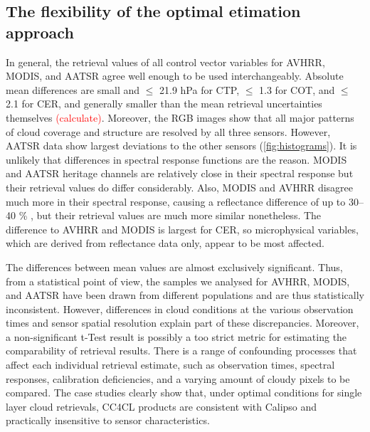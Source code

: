 \label{conclusions}

\subsection{The flexibility of the optimal etimation approach}


In general, the retrieval values of all control vector variables for AVHRR, MODIS, and AATSR agree well enough to be used interchangeably. Absolute mean differences are small and $\leq$ 21.9 hPa for CTP, $\leq$ 1.3 for COT, and $\leq$ 2.1 for CER, and generally smaller than the mean retrieval uncertainties themselves \textcolor{red}{(calculate)}. Moreover, the RGB images show that all major patterns of cloud coverage and structure are resolved by all three sensors. However, AATSR data show largest deviations to the other sensors (\cref{fig:histograms}). It is unlikely that differences in spectral response functions are the reason. MODIS and AATSR heritage channels are relatively close in their spectral response but their retrieval values do differ considerably. Also, MODIS and AVHRR disagree much more in their spectral response, causing a reflectance difference of up to 30--40 \% \citep{Trishchenko02}, but their retrieval values are much more similar nonetheless. The difference to AVHRR and MODIS is largest for CER, so microphysical variables, which are derived from reflectance data only, appear to be most affected. 

The differences between mean values are almost exclusively significant. Thus, from a statistical point of view, the samples we analysed for AVHRR, MODIS, and AATSR have been drawn from different populations and are thus statistically inconsistent. However, differences in cloud conditions at the various observation times and sensor spatial resolution explain part of these discrepancies. Moreover, a non-significant t-Test result is possibly a too strict metric for estimating the comparability of retrieval results. There is a range of confounding processes that affect each individual retrieval estimate, such as observation times, spectral responses, calibration deficiencies, and a varying amount of cloudy pixels to be compared. The case studies clearly show that, under optimal conditions for single layer cloud retrievals, CC4CL products are consistent with Calipso and practically insensitive to sensor characteristics.

